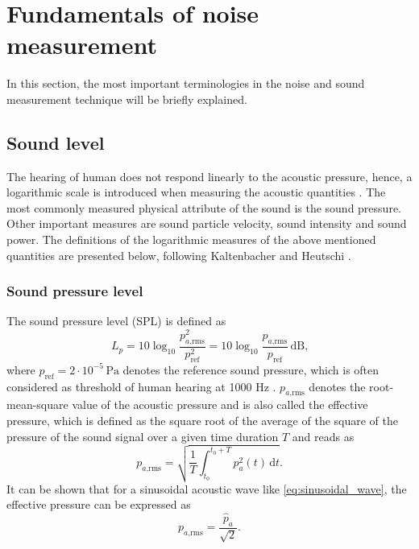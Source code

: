 \newpage
\section{Fundamentals of noise measurement}

In this section, the most important terminologies in the noise and sound measurement technique will be briefly explained.

\subsection{Sound level}

The hearing of human does not respond linearly to the acoustic pressure, hence, a logarithmic scale is introduced when measuring the acoustic quantities \cite{fahy_foundations_2001}. The most commonly measured physical attribute of the sound is the sound pressure. Other important measures are sound particle velocity, sound intensity and sound power. The definitions of the logarithmic measures of the above mentioned quantities are presented below, following Kaltenbacher \cite{kaltenbacher_computational_2018} and Heutschi \cite{heutschi_lecture_2016}.


\subsubsection*{Sound pressure level}
The sound pressure level (SPL) is defined as
\begin{equation}
	L_p = 10\log_{10}\frac{p_{a\text{,rms}}^2}{p_\text{ref}^2} = 10\log_{10}\frac{p_{a\text{,rms}}}{p_\text{ref}}\,\text{dB}\text{,}
\end{equation}
where $p_\text{ref} = 2\cdot10^{-5}\,\text{Pa}$ denotes the reference sound pressure, which is often considered as threshold of human hearing at 1000 Hz \cite{sinambari_ingenieurakustik_2020}. $p_{a\text{,rms}}$ denotes the root-mean-square value of the acoustic pressure and is also called the effective pressure, which is defined as the square root of the average of the square of the pressure of the sound signal over a given time duration $T$ and reads as
\begin{equation}
	p_{a\text{,rms}} = \sqrt{\frac{1}{T} \int_{t_0}^{t_0 + T} p_a^2(t)\,\text{d}t}\text{.}
\end{equation}
It can be shown that for a sinusoidal acoustic wave like \cref{eq:sinusoidal_wave}, the effective pressure can be expressed as \cite{peterson_1972_handbook}
\begin{equation}
	p_{a\text{,rms}} = \frac{\hat{p}_a}{\sqrt{2}}\text{.}
\end{equation}

